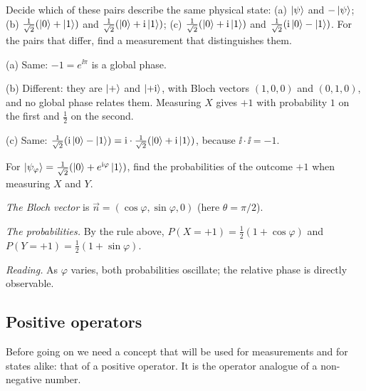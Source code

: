\begin{example}\label{ex:phase-pairs}
  Decide which of these pairs describe the same physical state: (a) $\left|\psi\right\rangle$ and $-\left|\psi\right\rangle$; (b) $\frac1{\sqrt2}(\left|0\right\rangle+\left|1\right\rangle)$ and $\frac1{\sqrt2}(\left|0\right\rangle+\mathrm{i}\left|1\right\rangle)$; (c) $\frac1{\sqrt2}(\left|0\right\rangle+\mathrm{i}\left|1\right\rangle)$ and $\frac1{\sqrt2}(\mathrm{i}\left|0\right\rangle-\left|1\right\rangle)$. For the pairs that differ, find a measurement that distinguishes them.
\end{example}
\begin{solution}
  \begin{steps}
    \item (a) Same: $-1=e^{\ii\pi}$ is a global phase.
    \item (b) Different: they are $\left|+\right\rangle$ and $\left|+\mathrm{i}\right\rangle$, with Bloch vectors $(1,0,0)$ and $(0,1,0)$, and no global phase relates them. Measuring $X$ gives $+1$ with probability $1$ on the first and $\tfrac12$ on the second.
    \item (c) Same: $\frac1{\sqrt2}(\mathrm{i}\left|0\right\rangle-\left|1\right\rangle)=\mathrm{i}\cdot\frac1{\sqrt2}(\left|0\right\rangle+\mathrm{i}\left|1\right\rangle)$, because $\ii\cdot\ii=-1$.
  \end{steps}
\end{solution}

\begin{example}\label{ex:phase-xy}
  For $\left|\psi_\varphi\right\rangle=\frac1{\sqrt2}(\left|0\right\rangle+e^{\mathrm{i}\varphi}\left|1\right\rangle)$, find the probabilities of the outcome $+1$ when measuring $X$ and $Y$.
\end{example}
\begin{solution}
  \begin{steps}
    \item \emph{The Bloch vector} is $\vec n=(\cos\varphi,\sin\varphi,0)$ (here $\theta=\pi/2$).
    \item \emph{The probabilities.} By the rule above, $P(X=+1)=\tfrac12(1+\cos\varphi)$ and $P(Y=+1)=\tfrac12(1+\sin\varphi)$.
    \item \emph{Reading.} As $\varphi$ varies, both probabilities oscillate; the relative phase is directly observable.
  \end{steps}
\end{solution}

\subsection{Positive operators}

Before going on we need a concept that will be used for measurements and for states alike: that of a positive operator. It is the operator analogue of a non-negative number.

